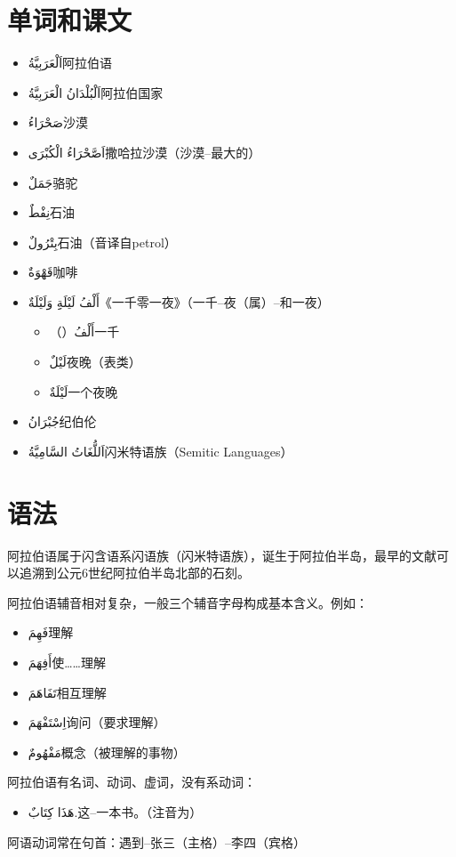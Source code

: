 \section{单词和课文}

\begin{itemize}
    \item \ac{اَلْعَرَبِيَّةُ}{阿拉伯语}
    \item \ac{اَلْبُلْدَانُ الْعَرَبِيَّةُ}{阿拉伯国家}
    \item \ac{صَحْرَاءُ}{沙漠}
    \item \ac{اَصَّحْرَاءُ الْكُبْرَى}{撒哈拉沙漠（沙漠--最大的）}
    \item \ac{جَمَلٌ}{骆驼}
    \item \ac{نِفْطٌ}{石油}
    \item \ac{بِتْرُولٌ}{石油（音译自petrol）}
    \item \ac{قَهْوَةٌ}{咖啡}
    \item \ac{أَلْفُ لَيْلَةِِ وَلَيْلَةٌ}{《一千零一夜》（一千--夜（属）--和一夜）}
    \begin{itemize}
        \item （）\ac{أَلْفُ}{一千}
        \item \ac{لَيْلٌ}{夜晚（表类）}
        \item \ac{لَيْلَةٌ}{一个夜晚}
    \end{itemize}
    \item \ac{جُبْرَانُ}{纪伯伦}
    \item \ac{اَللُّغَاتُ السَّامِيَّةُ}{闪米特语族（Semitic Languages）}
\end{itemize}

\section{语法}

阿拉伯语属于闪含语系闪语族（闪米特语族），诞生于阿拉伯半岛，最早的文献可以追溯到公元6世纪阿拉伯半岛北部的石刻。

阿拉伯语辅音相对复杂，一般三个辅音字母构成基本含义。例如：

\begin{itemize}
    \item \ac{فَهِمَ}{理解}
    \item \ac{أَفِهَمَ}{使……理解}
    \item \ac{تَفَاهَمَ}{相互理解}
    \item \ac{اِسْتَفْهَمَ}{询问（要求理解）}
    \item \ac{مَفْهُومٌ}{概念（被理解的事物）}
\end{itemize}

阿拉伯语有名词、动词、虚词，没有系动词：

\begin{itemize}
    \item \ac{هَذَا كِتَابٌ.}{这--一本书。（注音为）}
\end{itemize}

阿语动词常在句首：遇到--张三（主格）--李四（宾格）
